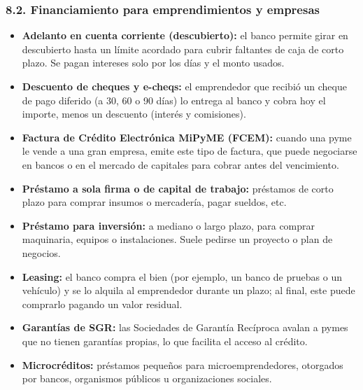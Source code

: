 \subsubsection*{8.2. Financiamiento para emprendimientos y empresas}
\begin{itemize}
  \item \textbf{Adelanto en cuenta corriente (descubierto):} el banco permite girar en
        descubierto hasta un límite acordado para cubrir faltantes de caja de corto plazo.
        Se pagan intereses solo por los días y el monto usados.
  \item \textbf{Descuento de cheques y e-cheqs:} el emprendedor que recibió un cheque de pago
        diferido (a 30, 60 o 90 días) lo entrega al banco y cobra hoy el importe, menos un
        descuento (interés y comisiones).
  \item \textbf{Factura de Crédito Electrónica MiPyME (FCEM):} cuando una pyme le vende a una
        gran empresa, emite este tipo de factura, que puede negociarse en bancos o en el
        mercado de capitales para cobrar antes del vencimiento.
  \item \textbf{Préstamo a sola firma o de capital de trabajo:} préstamos de corto plazo para
        comprar insumos o mercadería, pagar sueldos, etc.
  \item \textbf{Préstamo para inversión:} a mediano o largo plazo, para comprar maquinaria,
        equipos o instalaciones. Suele pedirse un proyecto o plan de negocios.
  \item \textbf{Leasing:} el banco compra el bien (por ejemplo, un banco de pruebas o un
        vehículo) y se lo alquila al emprendedor durante un plazo; al final, este puede
        comprarlo pagando un valor residual.
  \item \textbf{Garantías de SGR:} las Sociedades de Garantía Recíproca avalan a pymes que no
        tienen garantías propias, lo que facilita el acceso al crédito.
  \item \textbf{Microcréditos:} préstamos pequeños para microemprendedores, otorgados por
        bancos, organismos públicos u organizaciones sociales.
\end{itemize}

